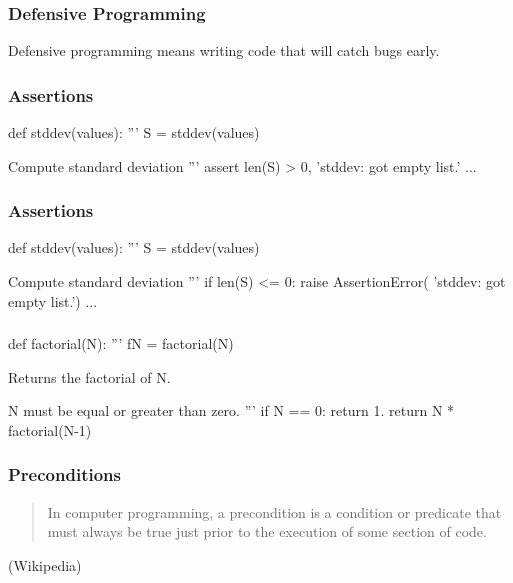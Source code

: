 \begin{frame}[fragile]
\frametitle{Defensive Programming}

Defensive programming means writing code that will catch bugs early.
\end{frame}

\begin{frame}[fragile]
\frametitle{Assertions}
\begin{python}
def stddev(values):
    '''
    S = stddev(values)

    Compute standard deviation
    '''
    assert len(S) > 0, 'stddev: got empty list.'
    ...
\end{python}
\end{frame}

\begin{frame}[fragile]
\frametitle{Assertions}

\begin{python}
def stddev(values):
    '''
    S = stddev(values)

    Compute standard deviation
    '''
    if len(S) <= 0:
        raise AssertionError(
            'stddev: got empty list.')
    ...
\end{python}

\end{frame}

\begin{frame}[fragile]
\frametitle{}

\begin{python}
def factorial(N):
    '''
    fN = factorial(N)

    Returns the factorial of N.

    N must be equal or greater than zero.
    '''
    if N == 0:
        return 1.
    return N * factorial(N-1)
\end{python}
\end{frame}

\begin{frame}[fragile]
\frametitle{Preconditions}

\begin{quote}
In computer programming, a precondition is a condition or predicate that must always be true just prior to the execution of some section of code.
\end{quote}

\begin{flushright}
(Wikipedia)
\end{flushright}

\end{frame}


